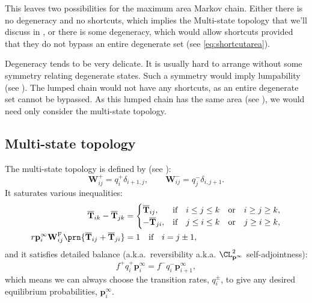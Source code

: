 \documentclass[12pt]{article}
\newcommand{\eq}{\mathbf{p}^\infty}
\newcommand{\fpt}{\mathbf{T}}
\newcommand{\fptb}{\overline{\fpt}}
\newcommand{\W}{\mathbf{W}}
\newcommand{\frg}{\W^{\mathrm{F}}}
\begin{document}
This leaves two possibilities for the maximum area Markov chain.
Either there is no degeneracy and no shortcuts, which implies the Multi-state topology that we'll discuss in , or there is some degeneracy, which would allow shortcuts provided that they do not bypass an entire degenerate set (see \eqref{eq:shortcutarea}).

Degeneracy tends to be very delicate. It is usually hard to arrange without some symmetry relating degenerate states. Such a symmetry would imply lumpability (see ). The lumped chain would not have any shortcuts, as an entire degenerate set cannot be bypassed. As this lumped chain has the same area (see ), we would need only consider the multi-state topology.


\subsection{Multi-state topology}\label{sec:multistate}

The multi-state topology is defined by (see \cite{amit1994learning,Fusi2007multistate}):
%
\begin{equation}\label{eq:multistatedef}
  \W^+_{ij} = q^+_i \delta_{i+1,j},
  \qquad
  \W^-_{ij} = q^-_j \delta_{i,j+1}.
\end{equation}
%
It saturates various inequalities:
%
\begin{equation}\label{eq:multistateineq}
  \begin{aligned}
    \fptb_{ik} - \fptb_{jk} &=
      \begin{cases}
        \fptb_{ij},  &\text{if}\quad i \leq j \leq k \quad\text{or}\quad i \geq j \geq k,\\
        -\fptb_{ji}, &\text{if}\quad j \leq i \leq k \quad\text{or}\quad j \geq i \geq k,\\
      \end{cases} \\
    r\eq_i \frg_{ij} \prn{\fptb_{ij}+\fptb_{ji}} &= 1 \quad\text{if}\quad i=j\pm1,
  \end{aligned}
\end{equation}
%
and it satisfies detailed balance (a.k.a.\ reversibility a.k.a. $\CL^2_{\eq}$ self-adjointness):
%
\begin{equation}\label{eq:multistateprob}
  f^+ q^+_i \eq_i = f^- q^-_i \eq_{i+1},
\end{equation}
%
which means we can always choose the transition rates, $q^\pm_i$, to give any desired equilibrium probabilities, $\eq_i$.
\end{document}
